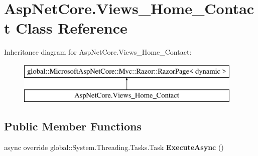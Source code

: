 \hypertarget{class_asp_net_core_1_1_views___home___contact}{}\section{Asp\+Net\+Core.\+Views\+\_\+\+Home\+\_\+\+Contact Class Reference}
\label{class_asp_net_core_1_1_views___home___contact}
Inheritance diagram for Asp\+Net\+Core.\+Views\+\_\+\+Home\+\_\+\+Contact\+:\begin{figure}[H]
\begin{center}
\leavevmode
\includegraphics[height=2.000000cm]{class_asp_net_core_1_1_views___home___contact}
\end{center}
\end{figure}
\subsection*{Public Member Functions}
\begin{DoxyCompactItemize}
\item 
\mbox{\label{class_asp_net_core_1_1_views___home___contact_a92aa0f485a3ebbc1d1171925e20288c8}} 
async override global\+::\+System.\+Threading.\+Tasks.\+Task {\bfseries Execute\+Async} ()
\end{DoxyCompactItemize}
